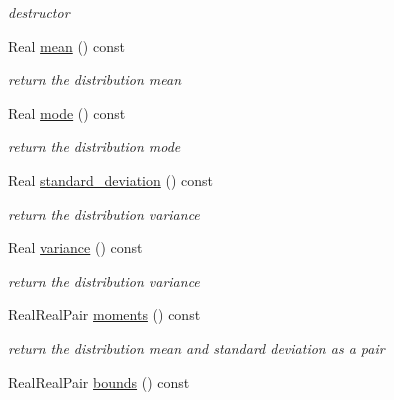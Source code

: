 \begin{DoxyCompactItemize}
\begin{DoxyCompactList}\small\item\em destructor \end{DoxyCompactList}\item 
Real \hyperlink{classPecos_1_1HistogramPtRandomVariable_a962ffe5a3593be370d5c883365c060f4}{mean} () const \label{classPecos_1_1HistogramPtRandomVariable_a962ffe5a3593be370d5c883365c060f4}

\begin{DoxyCompactList}\small\item\em return the distribution mean \end{DoxyCompactList}\item 
Real \hyperlink{classPecos_1_1HistogramPtRandomVariable_a72d3d6926edd929cb3f8e12baa655f70}{mode} () const \label{classPecos_1_1HistogramPtRandomVariable_a72d3d6926edd929cb3f8e12baa655f70}

\begin{DoxyCompactList}\small\item\em return the distribution mode \end{DoxyCompactList}\item 
Real \hyperlink{classPecos_1_1HistogramPtRandomVariable_a6a4ed9624d511f8a4e4f509c82cb0706}{standard\+\_\+deviation} () const \label{classPecos_1_1HistogramPtRandomVariable_a6a4ed9624d511f8a4e4f509c82cb0706}

\begin{DoxyCompactList}\small\item\em return the distribution variance \end{DoxyCompactList}\item 
Real \hyperlink{classPecos_1_1HistogramPtRandomVariable_a4b8b05b2a9af92dad9cc304c2925a4eb}{variance} () const \label{classPecos_1_1HistogramPtRandomVariable_a4b8b05b2a9af92dad9cc304c2925a4eb}

\begin{DoxyCompactList}\small\item\em return the distribution variance \end{DoxyCompactList}\item 
Real\+Real\+Pair \hyperlink{classPecos_1_1HistogramPtRandomVariable_a80e9024c98c6105a5eace8601a91b3d3}{moments} () const 
\begin{DoxyCompactList}\small\item\em return the distribution mean and standard deviation as a pair \end{DoxyCompactList}\item 
Real\+Real\+Pair \hyperlink{classPecos_1_1HistogramPtRandomVariable_a4bdb95a8fa5fffaa0de5102f56963cf2}{bounds} () const \label{classPecos_1_1HistogramPtRandomVariable_a4bdb95a8fa5fffaa0de5102f56963cf2}


\end{DoxyCompactItemize}
